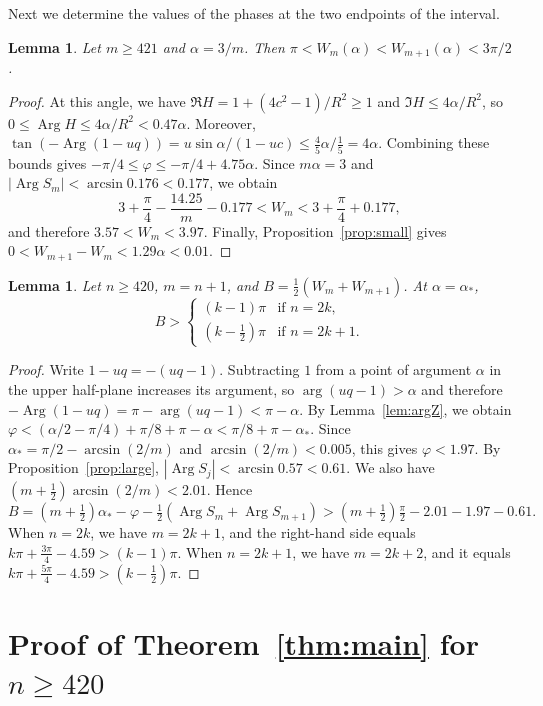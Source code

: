 \documentclass[11pt]{amsart}
\newtheorem{lemma}[theorem]{Lemma}
\theoremstyle{remark}
\newcommand{\Arg}{\operatorname{Arg}}
\begin{document}
Next we determine the values of the phases at the two endpoints of the
interval.

\begin{lemma}\label{lem:left}
Let $m\ge421$ and $\alpha=3/m$. Then $\pi<W_m(\alpha)<W_{m+1}(\alpha)<3\pi/2$.
\end{lemma}

\begin{proof}
At this angle, we have $\Re H=1+(4c^2-1)/R^2\ge1$ and $\Im H\le4\alpha/R^2$,
so $0\le\Arg H\le4\alpha/R^2<0.47\alpha$. Moreover,
$\tan(-\Arg(1-uq))=u\sin\alpha/(1-uc)\le\frac45\alpha/\frac15=4\alpha$.
Combining these bounds gives $-\pi/4\le\varphi\le-\pi/4+4.75\alpha$. Since
$m\alpha=3$ and $|\Arg S_m|<\arcsin0.176<0.177$, we obtain
\[
 3+\frac\pi4-\frac{14.25}{m}-0.177<W_m<3+\frac\pi4+0.177,
\]
and therefore $3.57<W_m<3.97$. Finally, Proposition~\ref{prop:small} gives
$0<W_{m+1}-W_m<1.29\alpha<0.01$.
\end{proof}

\begin{lemma}\label{lem:right}
Let $n\ge420$, $m=n+1$, and $B=\frac12(W_m+W_{m+1})$. At $\alpha=\alpha_*$,
\[
 B>\begin{cases}(k-1)\pi&\text{if } n=2k,\\ (k-\tfrac12)\pi&\text{if } n=2k+1.\end{cases}
\]
\end{lemma}

\begin{proof}
Write $1-uq=-(uq-1)$. Subtracting $1$ from a point of argument $\alpha$ in
the upper half-plane increases its argument, so $\arg(uq-1)>\alpha$ and
therefore $-\Arg(1-uq)=\pi-\arg(uq-1)<\pi-\alpha$. By Lemma~\ref{lem:argZ},
we obtain $\varphi<(\alpha/2-\pi/4)+\pi/8+\pi-\alpha<\pi/8+\pi-\alpha_*$.
Since $\alpha_*=\pi/2-\arcsin(2/m)$ and $\arcsin(2/m)<0.005$, this gives
$\varphi<1.97$. By Proposition~\ref{prop:large},
$|\Arg S_j|<\arcsin0.57<0.61$. We also have $(m+\frac12)\arcsin(2/m)<2.01$.
Hence
\[
 B=(m+\tfrac12)\alpha_*-\varphi-\tfrac12(\Arg S_m+\Arg S_{m+1})
 >(m+\tfrac12)\tfrac\pi2-2.01-1.97-0.61 .
\]
When $n=2k$, we have $m=2k+1$, and the right-hand side equals
$k\pi+\frac{3\pi}4-4.59>(k-1)\pi$. When $n=2k+1$, we have $m=2k+2$, and it
equals $k\pi+\frac{5\pi}4-4.59>(k-\frac12)\pi$.
\end{proof}

\section{Proof of Theorem~\ref{thm:main} for \texorpdfstring{$n\ge420$}{n >= 420}}\label{sec:proof}
\end{document}
